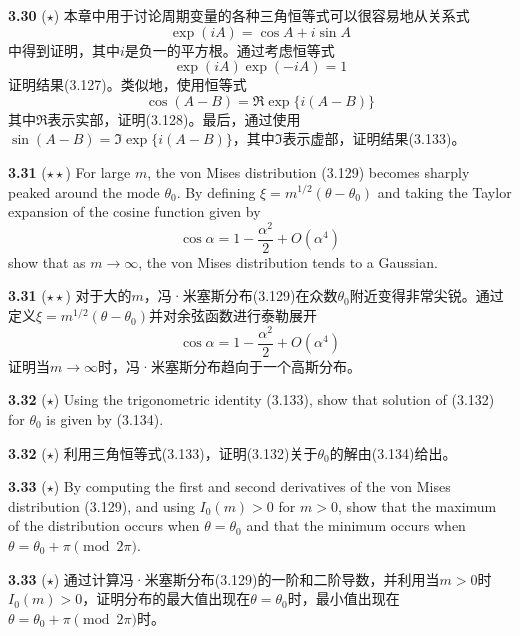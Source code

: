 \documentclass{article}
\begin{document}
\textbf{3.30} ($\star$) 本章中用于讨论周期变量的各种三角恒等式可以很容易地从关系式
\begin{equation}
\exp(iA) = \cos A + i \sin A \tag{3.214}
\end{equation}
中得到证明，其中$i$是负一的平方根。通过考虑恒等式
\begin{equation}
\exp(iA)\exp(-iA) = 1 \tag{3.215}
\end{equation}
证明结果(3.127)。类似地，使用恒等式
\begin{equation}
\cos(A-B) = \Re \exp\{i(A-B)\} \tag{3.216}
\end{equation}
其中$\Re$表示实部，证明(3.128)。最后，通过使用$\sin(A-B) = \Im \exp\{i(A-B)\}$，其中$\Im$表示虚部，证明结果(3.133)。

\textbf{3.31} ($\star\star$) For large $m$, the von Mises distribution (3.129) becomes sharply peaked around the mode $\theta_0$. By defining $\xi = m^{1/2}(\theta - \theta_0)$ and taking the Taylor expansion of the cosine function given by
\begin{equation}
\cos \alpha = 1 - \frac{\alpha^2}{2} + O(\alpha^4) \tag{3.217}
\end{equation}
show that as $m \to \infty$, the von Mises distribution tends to a Gaussian.

\textbf{3.31} ($\star\star$) 对于大的$m$，冯·米塞斯分布(3.129)在众数$\theta_0$附近变得非常尖锐。通过定义$\xi = m^{1/2}(\theta - \theta_0)$并对余弦函数进行泰勒展开
\begin{equation}
\cos \alpha = 1 - \frac{\alpha^2}{2} + O(\alpha^4) \tag{3.217}
\end{equation}
证明当$m \to \infty$时，冯·米塞斯分布趋向于一个高斯分布。

\textbf{3.32} ($\star$) Using the trigonometric identity (3.133), show that solution of (3.132) for $\theta_0$ is given by (3.134).

\textbf{3.32} ($\star$) 利用三角恒等式(3.133)，证明(3.132)关于$\theta_0$的解由(3.134)给出。

\textbf{3.33} ($\star$) By computing the first and second derivatives of the von Mises distribution (3.129), and using $I_0(m) > 0$ for $m > 0$, show that the maximum of the distribution occurs when $\theta = \theta_0$ and that the minimum occurs when $\theta = \theta_0 + \pi \pmod{2\pi}$.

\textbf{3.33} ($\star$) 通过计算冯·米塞斯分布(3.129)的一阶和二阶导数，并利用当$m>0$时$I_0(m)>0$，证明分布的最大值出现在$\theta = \theta_0$时，最小值出现在$\theta = \theta_0 + \pi \pmod{2\pi}$时。
\end{document}
